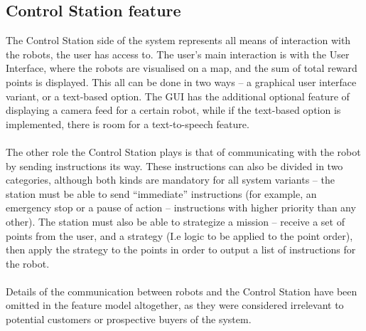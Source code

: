 \subsection{Control Station feature}
The Control Station side of the system represents all means of interaction with the robots, the user has access to. The user’s main interaction is with the User Interface, where the robots are visualised on a map, and the sum of total reward points is displayed. This all can be done in two ways – a graphical user interface variant, or a text-based option. The GUI has the additional optional feature of displaying a camera feed for a certain robot, while if the text-based option is implemented, there is room for a text-to-speech feature.
\\ \\
The other role the Control Station plays is that of communicating with the robot by sending instructions its way. These instructions can also be divided in two categories, although both kinds are mandatory for all system variants – the station must be able to send “immediate” instructions (for example, an emergency stop or a pause of action – instructions with higher priority than any other). The station must also be able to strategize a mission – receive a set of points from the user, and a strategy (I.e logic to be applied to the point order), then apply the strategy to the points in order to output a list of instructions for the robot. 
\\ \\
Details of the communication between robots and the Control Station have been omitted in the feature model altogether, as they were considered irrelevant to potential customers or prospective buyers of the system.